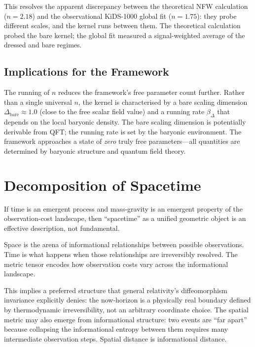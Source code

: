 \documentclass[12pt,a4paper]{article}
\begin{document}
This resolves the apparent discrepancy between the theoretical NFW calculation ($n = 2.18$) and the observational KiDS-1000 global fit ($n = 1.75$): they probe different scales, and the kernel runs between them. The theoretical calculation probed the bare kernel; the global fit measured a signal-weighted average of the dressed and bare regimes.

\subsection{Implications for the Framework}

The running of $n$ reduces the framework's free parameter count further. Rather than a single universal $n$, the kernel is characterised by a bare scaling dimension $\Delta_{\mathrm{bare}} \approx 1.0$ (close to the free scalar field value) and a running rate $\beta_\Delta$ that depends on the local baryonic density. The bare scaling dimension is potentially derivable from QFT; the running rate is set by the baryonic environment. The framework approaches a state of \emph{zero} truly free parameters---all quantities are determined by baryonic structure and quantum field theory.

\section{Decomposition of Spacetime}
\label{sec:spacetime}

If time is an emergent process and mass-gravity is an emergent property of the observation-cost landscape, then ``spacetime'' as a unified geometric object is an effective description, not fundamental.

Space is the arena of informational relationships between possible observations. Time is what happens when those relationships are irreversibly resolved. The metric tensor encodes how observation costs vary across the informational landscape.

This implies a preferred structure that general relativity's diffeomorphism invariance explicitly denies: the now-horizon is a physically real boundary defined by thermodynamic irreversibility, not an arbitrary coordinate choice. The spatial metric may also emerge from informational structure: two events are ``far apart'' because collapsing the informational entropy between them requires many intermediate observation steps. Spatial distance is informational distance.
\end{document}
